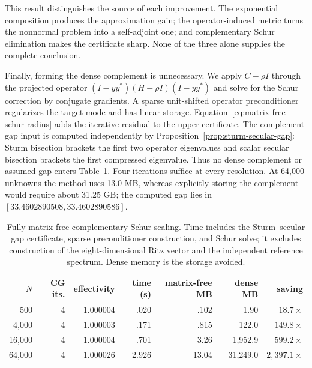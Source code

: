 \documentclass[11pt]{article}
\numberwithin{algorithm}{section}
\theoremstyle{definition}\newtheorem{definition}[theorem]{Definition}
\theoremstyle{remark}\newtheorem{remark}[theorem]{Remark}
\begin{document}
This result distinguishes the source of each improvement.  The exponential
composition produces the approximation gain; the operator-induced metric
turns the nonnormal problem into a self-adjoint one; and complementary Schur
elimination makes the certificate sharp.  None of the three alone supplies
the complete conclusion.

Finally, forming the dense complement is unnecessary.  We apply
$C-\rho I$ through the projected operator
$(I-yy^*)(H-\rho I)(I-yy^*)$ and solve for the Schur correction by conjugate
gradients.  A sparse unit-shifted operator preconditioner regularizes the
target mode and has linear storage.  Equation~\eqref{eq:matrix-free-schur-radius}
adds the iterative residual to the upper certificate.  The complement-gap
input is computed independently by Proposition~\ref{prop:sturm-secular-gap}:
Sturm bisection brackets the first two operator eigenvalues and scalar secular
bisection brackets the first compressed eigenvalue.  Thus no dense complement
or assumed gap enters Table~\ref{tab:matrix-free-schur}.  Four iterations
suffice at every resolution.  At 64,000 unknowns the method uses 13.0 MB,
whereas explicitly storing the complement would require about 31.25 GB; the
computed gap lies in $[33.4602890508,33.4602890586]$.

\begin{table}[t]
\centering
\caption{Fully matrix-free complementary Schur scaling.  Time includes the
Sturm--secular gap certificate, sparse preconditioner construction, and Schur
solve; it excludes construction of the eight-dimensional Ritz vector and the
independent reference spectrum.  Dense memory is the storage avoided.}
\label{tab:matrix-free-schur}
\begin{tabular}{rrrrrrr}
\toprule
$N$ & CG its. & effectivity & time (s) & matrix-free MB & dense MB & saving\\
\midrule
500   & 4 & 1.000004 & .020 & .102 & 1.90 & $18.7\times$\\
4,000 & 4 & 1.000003 & .171 & .815 & 122.0 & $149.8\times$\\
16,000& 4 & 1.000004 & .701 & 3.26 & 1,952.9 & $599.2\times$\\
64,000& 4 & 1.000026 & 2.926 & 13.04 & 31,249.0 & $2,397.1\times$\\
\bottomrule
\end{tabular}
\end{table}
\end{document}
